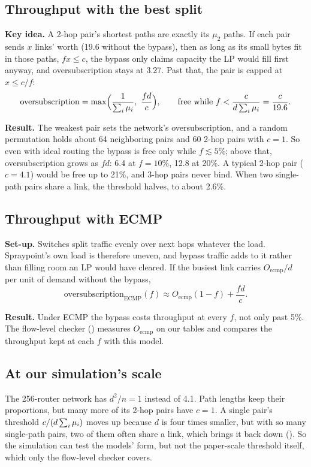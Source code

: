 \subsection{Throughput with the best split}
\label{sec:model-bypass-lp}

\textbf{Key idea.} A 2-hop pair's shortest paths are exactly its $\mu_2$ paths. If each pair sends $x$ links' worth (19.6 without the bypass), then as long as its small bytes fit in those paths, $f x \le c$, the bypass only claims capacity the LP would fill first anyway, and oversubscription stays at 3.27. Past that, the pair is capped at $x \le c/f$:
\[
\text{oversubscription} = \max\!\Big( \frac{1}{\textstyle\sum_i \mu_i},\ \frac{f d}{c} \Big),
\qquad
\text{free while } f < \frac{c}{d \textstyle\sum_i \mu_i} = \frac{c}{19.6}.
\]

\textbf{Result.} The weakest pair sets the network's oversubscription, and a random permutation holds about 64 neighboring pairs and 60 2-hop pairs with $c = 1$. So even with ideal routing the bypass is free only while $f \lesssim 5\%$; above that, oversubscription grows as $f d$: 6.4 at $f = 10\%$, 12.8 at 20\%. A typical 2-hop pair ($c = 4.1$) would be free up to 21\%, and 3-hop pairs never bind. When two single-path pairs share a link, the threshold halves, to about 2.6\%.

\subsection{Throughput with ECMP}
\label{sec:model-bypass-ecmp}

\textbf{Set-up.} Switches split traffic evenly over next hops whatever the load. Spraypoint's own load is therefore uneven, and bypass traffic adds to it rather than filling room an LP would have cleared. If the busiest link carries $O_{\text{ecmp}}/d$ per unit of demand without the bypass,
\[
\text{oversubscription}_{\text{ECMP}}(f) \approx O_{\text{ecmp}} (1 - f) + \frac{f d}{c}.
\]

\textbf{Result.} Under ECMP the bypass costs throughput at every $f$, not only past 5\%. The flow-level checker () measures $O_{\text{ecmp}}$ on our tables and compares the throughput kept at each $f$ with this model.

\subsection{At our simulation's scale}
\label{sec:models-scale}

The 256-router network has $d^2/n = 1$ instead of 4.1. Path lengths keep their proportions, but many more of its 2-hop pairs have $c = 1$. A single pair's threshold $c/(d \textstyle\sum_i \mu_i)$ moves up because $d$ is four times smaller, but with so many single-path pairs, two of them often share a link, which brings it back down (). So the simulation can test the models' form, but not the paper-scale threshold itself, which only the flow-level checker covers.
